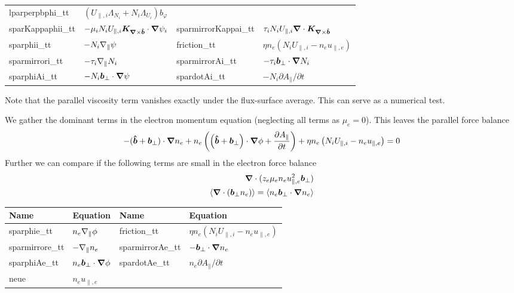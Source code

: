 \begin{longtable}{llll}
    lparperpbphi\_tt & $(U_{\parallel,i} \Lambda_{N_i} + N_i\Lambda_{U_i})b_\varphi $ \\
    sparKappaphii\_tt & $-\mu_i N_i U_{\parallel,i} {{\boldsymbol{K}}_{{\boldsymbol{\nabla}}\times\bm{\hat{b}}}}\cdot{\boldsymbol{\nabla}} \psi_i$ &
    sparmirrorKappai\_tt & $\tau_i N_i U_{\parallel,i} {\boldsymbol{\nabla}}\cdot{{\boldsymbol{K}}_{{\boldsymbol{\nabla}}\times\bm{\hat{b}}}}$ \\
    sparphii\_tt & $-N_i\nabla_\parallel \psi$ &
    friction\_tt & $ \eta n_e(N_iU_{\parallel,i}-n_eu_{\parallel,e})$ \\
    sparmirrori\_tt & $-\tau_i\nabla_\parallel N_i$ &
    sparmirrorAi\_tt & $-\tau_i {\boldsymbol{b}}_\perp \cdot{\boldsymbol{\nabla}} N_i $ \\
    sparphiAi\_tt & $ -N_i {\boldsymbol{b}}_\perp \cdot{\boldsymbol{\nabla}} \psi $ &
    spardotAi\_tt & $ -N_i \partial A_\parallel /\partial t$ \\
\bottomrule
\end{longtable}
Note that the parallel viscosity term vanishes exactly under the flux-surface average. This can serve as a numerical test.

We gather the dominant terms in the electron momentum equation (neglecting all terms as $\mu_e=0$). This leaves the parallel force balance
\begin{align}
    -(\bm{\hat{b}} + {\boldsymbol{b}}_\perp) \cdot{\boldsymbol{\nabla}} n_e +n_e\left( \left( \bm{\hat{b}} + {\boldsymbol{b}}_\perp \right) \cdot{\boldsymbol{\nabla}} \phi + \frac{\partial A_\parallel}{\partial t} \right) +\eta n_e \left( N_iU_{\parallel,i} - n_eu_{\parallel,e}\right) = 0
\end{align}
Further we can compare if the following terms are small in the electron force balance
\begin{align*}
    {\boldsymbol{\nabla}}\cdot( z_e \mu_e n_e u_{\parallel,e}^2{\boldsymbol{b}}_\perp)\\
    \left \langle {\boldsymbol{\nabla}}\cdot ( {\boldsymbol{b}}_\perp n_e ) \right \rangle = \left \langle n_e {\boldsymbol{b}}_\perp \cdot{\boldsymbol{\nabla}} n_e \right \rangle
\end{align*}
\begin{longtable}{llll}
\toprule
\rowcolor{gray!50}\textbf{Name} &  \textbf{Equation} &
\textbf{Name} &  \textbf{Equation}\\
\midrule
    sparphie\_tt & $n_e\nabla_\parallel \phi$ &
    friction\_tt & $ \eta n_e(N_iU_{\parallel,i}-n_eu_{\parallel,e})$ \\
    sparmirrore\_tt & $-\nabla_\parallel n_e$ &
    sparmirrorAe\_tt & $-{\boldsymbol{b}}_\perp \cdot{\boldsymbol{\nabla}} n_e $ \\
    sparphiAe\_tt & $n_e {\boldsymbol{b}}_\perp \cdot{\boldsymbol{\nabla}} \phi$ &
    spardotAe\_tt & $ n_e \partial A_\parallel /\partial t$ \\
    neue &$n_e u_{\parallel,e}$ &
    & \\
\bottomrule
\end{longtable}


